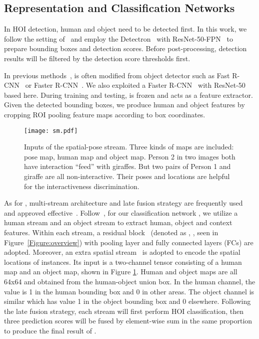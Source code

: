 \documentclass[10pt,twocolumn,letterpaper]{article}
\begin{document}
\subsection{Representation and Classification Networks}
\label{sec:ec}
 In HOI detection, human and object need to be detected first. In this work, we follow the setting of~\cite{gao2018ican} and employ the Detectron~\cite{detectron} with ResNet-50-FPN~\cite{fpn} to prepare bounding boxes and detection scores. Before post-processing, detection results will be filtered by the detection score thresholds first.

 In previous methods~\cite{hicodet,Gkioxari2017Detecting,gao2018ican},  is often modified from object detector such as Fast R-CNN~\cite{fastrcnn} or Faster R-CNN~\cite{faster-rcnn}. We also exploited a Faster R-CNN~\cite{faster-rcnn} with ResNet-50~\cite{resnet} based  here. During training and testing,  is frozen and acts as a feature extractor.  
Given the detected bounding boxes, we produce human and object features by cropping ROI pooling feature maps according to box coordinates. 
\begin{figure}[!ht]
	\begin{center}
		\texttt{[image: sm.pdf]}
	\end{center}
	\caption{Inputs of the spatial-pose stream. Three kinds of maps are included: pose map, human map and object map. Person 2 in two images both have interaction ``feed'' with giraffes. But two pairs of Person 1 and giraffe are all non-interactive. Their poses and locations are helpful for the interactiveness discrimination.}
	\label{Figure:d work reason}
	\vspace{-0.3cm}
\end{figure}

 As for , multi-stream architecture and late fusion strategy are frequently used and approved effective~\cite{hicodet,gao2018ican}. 
Follow~\cite{hicodet,gao2018ican}, for our classification network , we utilize a human stream and an object stream to extract human, object and context features. Within each stream, a residual block~\cite{resnet} (denoted as , , seen in Figure~\ref{Figure:overview}) with pooling layer and fully connected layers (FCs) are adopted.
Moreover, an extra spatial stream~\cite{hicodet} is adopted to encode the spatial locations of instances. Its input is a two-channel tensor consisting of a human map and an object map, shown in Figure \ref{Figure:d work reason}. Human and object maps are all 64x64 and obtained from the human-object union box. In the human channel, the value is 1 in the human bounding box and 0 in other areas. The object channel is similar which has value 1 in the object bounding box and 0 elsewhere.
Following the late fusion strategy, each stream will first perform HOI classification, then three prediction scores will be fused by element-wise sum in the same proportion to produce the final result of .
\end{document}
